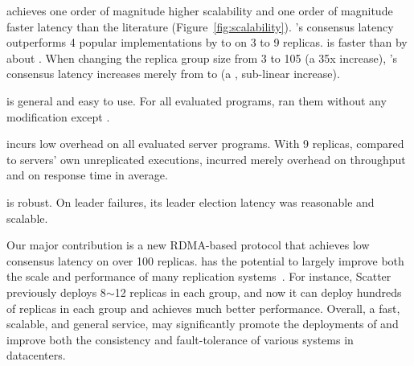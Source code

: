 \begin{tightenum}
\item \xxx achieves one order of magnitude higher scalability and one
order of magnitude faster latency than the literature 
(Figure~\ref{fig:scalability}). \xxx's consensus latency outperforms 4 
popular \paxos implementations by \comptradlow to \comptradhigh on 3 to 
9 replicas. \xxx is faster than \dare by about \fasterDARE. When changing the 
replica group size from 3 to 105 (a 35x
increase), \xxx's consensus latency increases merely from \xxxlatencythree \us 
to
\xxxlatencyonezerofive \us (a \xxxscalability, sub-linear increase).

\item \xxx is general and easy to use. For all \nprog evaluated programs, \xxx 
ran them without any modification except \calvin.


\item \xxx incurs low overhead on all \nprog evaluated server programs.
With 9 replicas, compared to servers' own unreplicated executions, \xxx
incurred merely \tputoverhead overhead on throughput and \latencyoverhead on
response time in average.

\item \xxx is robust. On leader failures, its leader election
latency was reasonable and scalable.







\end{tightenum}

Our major contribution is a new RDMA-based \paxos protocol that achieves 
low consensus latency on over 100 replicas. \xxx has the potential to largely 
improve both the scale and performance of many replication 
systems~\cite{scatter:sosp11,manos:hotdep10,crane:sosp15,rex:eurosys14, 
ssmr:dsn14,spaxos:srds12}. For instance, Scatter~\cite{scatter:sosp11} 
previously deploys 8$\sim$12 replicas in each \paxos group, and now it can 
deploy hundreds of replicas in each group and achieves much better performance. 
Overall, a fast, scalable, and general service, \xxx may significantly promote 
the deployments of \paxos and improve both the consistency and 
fault-tolerance of various systems in datacenters.

